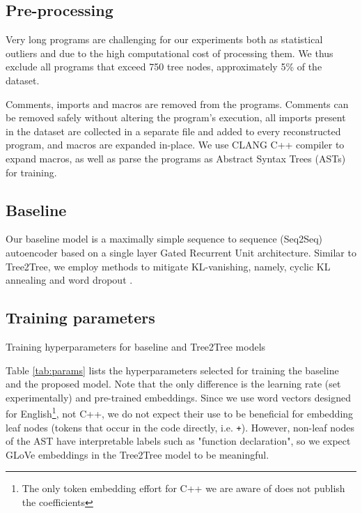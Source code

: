 \subsection{Pre-processing}
\label{sec:preprocessing}

Very long programs are challenging for our experiments both as statistical outliers and due to the high computational cost of processing them. We thus exclude all programs that exceed 750 tree nodes, approximately 5\% of the dataset.

Comments, imports and macros are removed from the programs.
Comments can be removed safely without altering the program's execution, all imports present in the dataset are collected in a separate file and added to every reconstructed program, and macros are expanded in-place.
We use CLANG C++ compiler to expand macros, as well as parse the programs as Abstract Syntax Trees (ASTs) for training.

\subsection{Baseline}

Our baseline model is a maximally simple sequence to sequence (Seq2Seq) autoencoder based on a single layer Gated Recurrent Unit \cite{chung2014empirical} architecture. Similar to Tree2Tree, we employ methods to mitigate KL-vanishing, namely, cyclic KL annealing \cite{fu2019cyclical} and word dropout \cite{bowman2015generating}.

\subsection{Training parameters}

\begin{table}
\centering

\caption{Training hyperparameters for baseline and Tree2Tree models}
\label{tab:params}
\end{table}

Table \ref{tab:params} lists the hyperparameters selected for training the baseline and the proposed model.
Note that the only difference is the learning rate (set experimentally) and pre-trained embeddings.
Since we use word vectors designed for English\footnote{The only token embedding effort for C++ we are aware of \cite{harerAutomatedSoftwareVulnerability2018} does not publish the coefficients}, not C++, we do not expect their use to be beneficial for embedding leaf nodes (tokens that occur in the code directly, i.e. \verb|+|).
However, non-leaf nodes of the AST have interpretable labels such as "function declaration", so we expect GLoVe \cite{pennington2014glove} embeddings in the Tree2Tree model to be meaningful.

